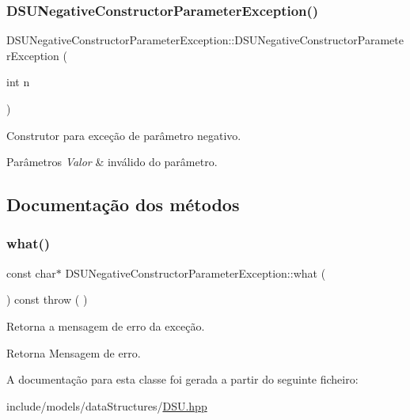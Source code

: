 \subsubsection{\texorpdfstring{DSUNegativeConstructorParameterException()}{DSUNegativeConstructorParameterException()}}
{\footnotesize\ttfamily D\+S\+U\+Negative\+Constructor\+Parameter\+Exception\+::\+D\+S\+U\+Negative\+Constructor\+Parameter\+Exception (\begin{DoxyParamCaption}\item[{int}]{n }\end{DoxyParamCaption})\hspace{0.3cm}{\ttfamily [inline]}}

Construtor para exceção de parâmetro negativo. 
\begin{DoxyParams}{Parâmetros}
{\em Valor} & inválido do parâmetro. \\
\hline
\end{DoxyParams}


\subsection{Documentação dos métodos}
\mbox{\label{classDSUNegativeConstructorParameterException_a16a3dcf8c0aeca0c1158ee18dd2a0c0f}} 
\subsubsection{\texorpdfstring{what()}{what()}}
{\footnotesize\ttfamily const char$\ast$ D\+S\+U\+Negative\+Constructor\+Parameter\+Exception\+::what (\begin{DoxyParamCaption}{ }\end{DoxyParamCaption}) const throw ( ) \hspace{0.3cm}{\ttfamily [inline]}}

Retorna a mensagem de erro da exceção. \begin{DoxyReturn}{Retorna}
Mensagem de erro. 
\end{DoxyReturn}


A documentação para esta classe foi gerada a partir do seguinte ficheiro\+:\begin{DoxyCompactItemize}
\item 
include/models/data\+Structures/\mbox{\hyperlink{DSU_8hpp}{D\+S\+U.\+hpp}}\end{DoxyCompactItemize}
